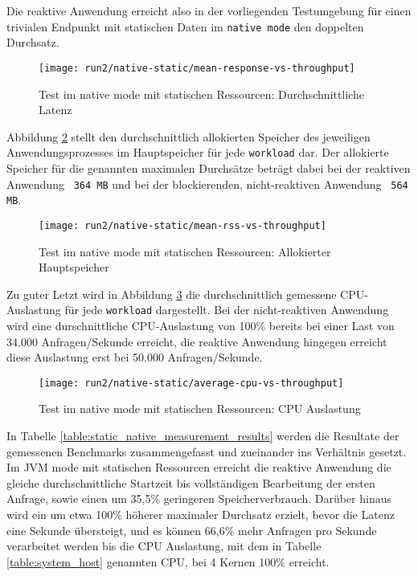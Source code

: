 Die reaktive Anwendung erreicht also in der vorliegenden Testumgebung für einen trivialen
Endpunkt mit statischen Daten im \verb|native mode| den doppelten Durchsatz.
\newpage
\begin{figure}[ht!]
    \centering
    \texttt{[image: run2/native-static/mean-response-vs-throughput]}
    \caption{Test im native mode mit statischen Ressourcen: Durchschnittliche Latenz}
    \label{fig:native_static_mean_response}
\end{figure}
Abbildung \ref{fig:native_static_mean_rss} stellt den durchschnittlich allokierten Speicher des jeweiligen Anwendungsprozesses
im Hauptspeicher für jede \verb|workload| dar. Der allokierte Speicher für die genannten maximalen Durchsätze beträgt dabei bei
der reaktiven Anwendung ~\verb|364 MB| und bei der blockierenden, nicht-reaktiven Anwendung ~\verb|564 MB|.
\newpage
\begin{figure}[ht!]
    \centering
    \texttt{[image: run2/native-static/mean-rss-vs-throughput]}
    \caption{Test im native mode mit statischen Ressourcen: Allokierter Hauptspeicher}
    \label{fig:native_static_mean_rss}
\end{figure}

Zu guter Letzt wird in Abbildung \ref{fig:native_static_avg_cpu} die durchschnittlich gemessene CPU-Auslastung für jede \verb|workload|
dargestellt. Bei der nicht-reaktiven Anwendung wird eine durschnittliche CPU-Auslastung von 100\% bereits bei einer Last von
34.000 Anfragen/Sekunde erreicht, die reaktive Anwendung hingegen erreicht diese Auslastung erst bei 50.000 Anfragen/Sekunde.
\newpage
\begin{figure}[ht!]
    \centering
    \texttt{[image: run2/native-static/average-cpu-vs-throughput]}
    \caption{Test im native mode mit statischen Ressourcen: CPU Auslastung}
    \label{fig:native_static_avg_cpu}
\end{figure}

In Tabelle \ref{table:static_native_measurement_results} werden die Resultate der gemessenen Benchmarks zusammengefasst
und zueinander ins Verhältnis gesetzt. Im JVM mode mit statischen Ressourcen erreicht die reaktive Anwendung
die gleiche durchschnittliche Startzeit bis vollständigen Bearbeitung der ersten Anfrage, sowie
einen um 35,5\% geringeren Speicherverbrauch.
Darüber hinaus wird ein um etwa 100\% höherer maximaler Durchsatz erzielt, bevor die Latenz eine Sekunde übersteigt, und
es können 66,6\% mehr Anfragen pro Sekunde verarbeitet werden bis die CPU Auslastung, mit dem in Tabelle \ref{table:system_host}
genannten CPU, bei 4 Kernen 100\% erreicht.

